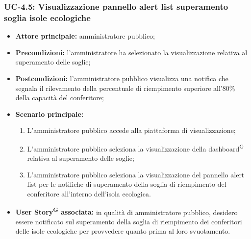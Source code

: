 \documentclass[8pt]{article}
\newcommand{\glossterm}[1]{#1\textsuperscript{G}} %
\begin{document}
\subsubsection*{UC-4.5: Visualizzazione pannello alert list superamento soglia isole ecologiche}
\begin{itemize}
    \item \textbf{Attore principale:} amministratore pubblico;
    \item \textbf{Precondizioni:} l'amministratore ha selezionato la visualizzazione relativa al superamento delle soglie;
    \item \textbf{Postcondizioni:} l’amministratore pubblico visualizza una notifica che segnala il rilevamento della percentuale di riempimento superiore all'80\% della capacità del conferitore;
    \item \textbf{Scenario principale:}
        \begin{enumerate}
        \item L’amministratore pubblico accede alla piattaforma di visualizzazione;
        \item L’amministratore pubblico seleziona la visualizzazione della \glossterm{dashboard} relativa al superamento delle soglie;
        \item L'amministratore pubblico seleziona la visualizzazione del pannello alert list per le notifiche di superamento della soglia di riempimento del conferitore all'interno dell'isola ecologica.
        \end{enumerate}
    \item \textbf{\glossterm{User Story} associata:} in qualità di amministratore pubblico, desidero essere notificato sul superamento della soglia di riempimento dei conferitori delle isole ecologiche per provvedere quanto prima al loro svuotamento.
\end{itemize}
\end{document}
